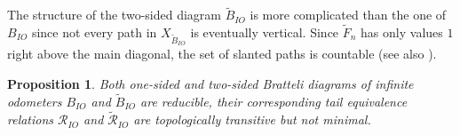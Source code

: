 \documentclass[11pt, twoside]{amsart}
\theoremstyle{definition}
\theoremstyle{remark}
\theoremstyle{plain}
\newtheorem{prop}[definition]{Proposition}
\def\tl{\widetilde}
\numberwithin{equation}{section}
\begin{document}

The structure of the two-sided diagram $\tl B_{IO}$ is more complicated than the one of $B_{IO}$ since not every path in $X_{\tl B_{IO}}$ is eventually vertical. Since $\tl F_n$ has only values $1$ right above the main diagonal, the set of slanted paths is countable (see also \cite[Proposition 5.5]{BezuglyiJorgensenKarpelSanadhya2025}).

\begin{prop}
Both one-sided and two-sided Bratteli diagrams of infinite odometers $B_{IO}$ and $\tl B_{IO}$ are reducible, their corresponding tail equivalence relations $\mathcal{R}_{IO}$ and $\widetilde{\mathcal{R}}_{IO}$ are topologically transitive but not minimal. 
\end{prop}
\end{document}
